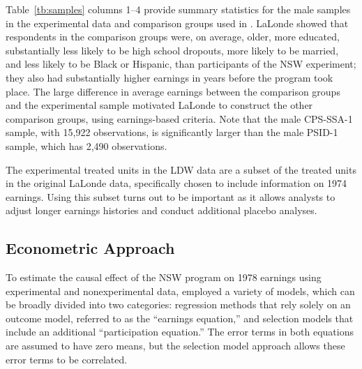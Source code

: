 \documentclass[letterpaper,12pt,leqno]{article}
\begin{document}
Table~\ref{tb:samples} columns 1--4 provide summary statistics for the male samples in the experimental data and comparison groups used in \citet{LaLonde}. LaLonde showed that respondents in the comparison groups were, on average, older, more educated, substantially less likely to be high school dropouts, more likely to be married, and less likely to be Black or Hispanic, than participants of the NSW experiment; they also had substantially higher earnings in years before the program took place. The large difference in average earnings between the comparison groups and the experimental sample motivated LaLonde to construct the other comparison groups, using earnings-based criteria.
Note that the male CPS-SSA-1 sample, with 15,922 observations, is significantly larger than the male PSID-1 sample, which has 2,490 observations. 

The experimental treated units in the LDW data are a subset of the treated units in the original LaLonde data, specifically chosen to include information on 1974 earnings. Using this subset turns out to be important as it allows analysts to adjust longer earnings histories and conduct additional placebo analyses.

\subsection{Econometric Approach}

To estimate the causal effect of the NSW program on 1978 earnings using experimental and nonexperimental data, \citet{LaLonde} employed a variety of models, which can be broadly divided into two categories: regression methods that rely solely on an outcome model, referred to as the ``earnings equation,'' and selection models that include an additional ``participation equation.'' The error terms in both equations are assumed to have zero means, but the selection model approach allows these error terms to be correlated.
\end{document}
